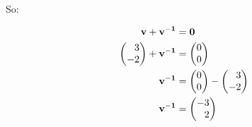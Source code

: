 \documentclass[12pt]{article}
\newenvironment{abc}{\begin{enumerate}[label={\bf(\alph*)}]}{\end{enumerate}}
\newcommand\m[2][]{
	\ifthenelse{\equal {#1} {}}
		{\begin{pmatrix*}[r]#2\end{pmatrix*}}
		{\left(\begin{array}{#1}#2\end{array}\right)}
}
\renewcommand{\vec}[1]{\mathbf{#1}}
\begin{document}
\begin{abc}
\begin{item}
	So:

	\begin{equation*}
	\begin{aligned}
		\vec{v} + \vec{v^{-1}} &= \vec{0} \\
		\m{3 \\ -2} + \vec{v^{-1}} &= \m{0 \\ 0} \\
		\vec{v^{-1}} &= \m{0 \\ 0} - \m{3 \\ -2} \\
		\vec{v^{-1}} &= \m{-3 \\ 2}
	\end{aligned}
	\end{equation*}
\end{item}
\end{abc}
\end{document}
